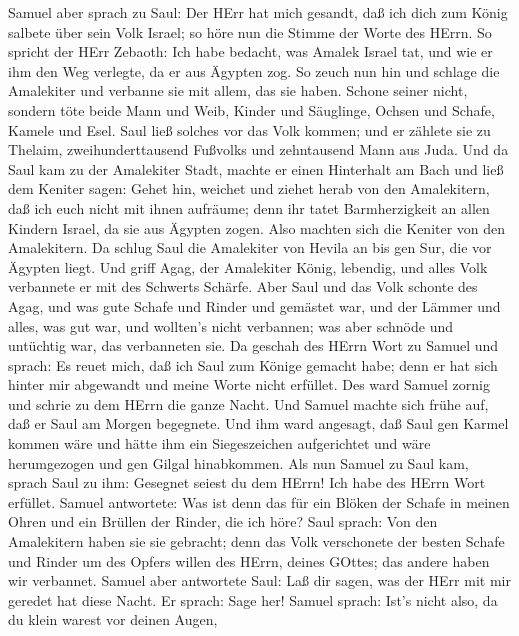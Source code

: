  Samuel aber sprach zu Saul: Der HErr hat mich gesandt, daß
ich dich zum König salbete über sein Volk Israel; so höre nun die Stimme
der Worte des HErrn.  So spricht der HErr Zebaoth: Ich habe
bedacht, was Amalek Israel tat, und wie er ihm den Weg verlegte, da er
aus Ägypten zog.  So zeuch nun hin und schlage die
Amalekiter und verbanne sie mit allem, das sie haben. Schone seiner
nicht, sondern töte beide Mann und Weib, Kinder und Säuglinge, Ochsen
und Schafe, Kamele und Esel.  Saul ließ solches vor das Volk
kommen; und er zählete sie zu Thelaim, zweihunderttausend Fußvolks und
zehntausend Mann aus Juda.  Und da Saul kam zu der
Amalekiter Stadt, machte er einen Hinterhalt am Bach  und
ließ dem Keniter sagen: Gehet hin, weichet und ziehet herab von den
Amalekitern, daß ich euch nicht mit ihnen aufräume; denn ihr tatet
Barmherzigkeit an allen Kindern Israel, da sie aus Ägypten zogen. Also
machten sich die Keniter von den Amalekitern.  Da schlug
Saul die Amalekiter von Hevila an bis gen Sur, die vor Ägypten liegt.
 Und griff Agag, der Amalekiter König, lebendig, und alles
Volk verbannete er mit des Schwerts Schärfe.  Aber Saul und
das Volk schonte des Agag, und was gute Schafe und Rinder und gemästet
war, und der Lämmer und alles, was gut war, und wollten's nicht
verbannen; was aber schnöde und untüchtig war, das verbanneten sie.
 Da geschah des HErrn Wort zu Samuel und sprach:
 Es reuet mich, daß ich Saul zum Könige gemacht habe; denn
er hat sich hinter mir abgewandt und meine Worte nicht erfüllet. Des
ward Samuel zornig und schrie zu dem HErrn die ganze Nacht.
 Und Samuel machte sich frühe auf, daß er Saul am Morgen
begegnete. Und ihm ward angesagt, daß Saul gen Karmel kommen wäre und
hätte ihm ein Siegeszeichen aufgerichtet und wäre herumgezogen und gen
Gilgal hinabkommen.  Als nun Samuel zu Saul kam, sprach
Saul zu ihm: Gesegnet seiest du dem HErrn! Ich habe des HErrn Wort
erfüllet.  Samuel antwortete: Was ist denn das für ein
Blöken der Schafe in meinen Ohren und ein Brüllen der Rinder, die ich
höre?  Saul sprach: Von den Amalekitern haben sie sie
gebracht; denn das Volk verschonete der besten Schafe und Rinder um des
Opfers willen des HErrn, deines GOttes; das andere haben wir verbannet.
 Samuel aber antwortete Saul: Laß dir sagen, was der HErr
mit mir geredet hat diese Nacht. Er sprach: Sage her! 
Samuel sprach: Ist's nicht also, da du klein warest vor deinen Augen,
